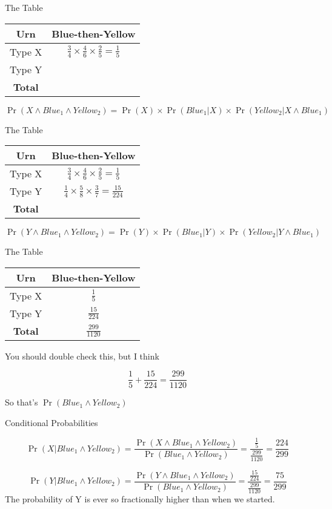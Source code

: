 \documentclass[
  ignorenonframetext,
]{beamer}
\renewcommand{\,}{\text{, }}
\begin{document}
\begin{frame}{The Table}
\protect\hypertarget{the-table}{}

\begin{longtable}[]{@{}cc@{}}
\toprule
Urn & Blue-then-Yellow\tabularnewline
\midrule
\endhead
Type X &
\(\frac{3}{4} \times \frac{4}{6} \times \frac{2}{5} = \frac{1}{5}\)\tabularnewline
Type Y &\tabularnewline
\textbf{Total} &\tabularnewline
\bottomrule
\end{longtable}

\[
\Pr(X \wedge Blue_1 \wedge Yellow_2) = \Pr(X) \times \Pr(Blue_1 | X) \times \Pr(Yellow_2 | X \wedge Blue_1)
\]

\end{frame}

\begin{frame}{The Table}
\protect\hypertarget{the-table-1}{}

\begin{longtable}[]{@{}cc@{}}
\toprule
Urn & Blue-then-Yellow\tabularnewline
\midrule
\endhead
Type X &
\(\frac{3}{4} \times \frac{4}{6} \times \frac{2}{5} = \frac{1}{5}\)\tabularnewline
Type Y &
\(\frac{1}{4} \times \frac{5}{8} \times \frac{3}{7} = \frac{15}{224}\)\tabularnewline
\textbf{Total} &\tabularnewline
\bottomrule
\end{longtable}

\[
\Pr(Y \wedge Blue_1 \wedge Yellow_2) = \Pr(Y) \times \Pr(Blue_1 | Y) \times \Pr(Yellow_2 | Y \wedge Blue_1)
\]

\end{frame}

\begin{frame}{The Table}
\protect\hypertarget{the-table-2}{}

\begin{longtable}[]{@{}cc@{}}
\toprule
Urn & Blue-then-Yellow\tabularnewline
\midrule
\endhead
Type X & \(\frac{1}{5}\)\tabularnewline
Type Y & \(\frac{15}{224}\)\tabularnewline
\textbf{Total} & \(\frac{299}{1120}\)\tabularnewline
\bottomrule
\end{longtable}

You should double check this, but I think

\[
\frac{1}{5} + \frac{15}{224} = \frac{299}{1120}
\]

So that's \(\Pr(Blue_1 \wedge Yellow_2)\)

\end{frame}

\begin{frame}{Conditional Probabilities}
\protect\hypertarget{conditional-probabilities}{}

\[
\Pr(X | Blue_1 \wedge Yellow_2) = \frac{\Pr(X \wedge Blue_1 \wedge Yellow_2)}{\Pr(Blue_1 \wedge Yellow_2)} = \frac{\frac{1}{5}}{\frac{299}{1120}} = \frac{224}{299}
\]

\[
\Pr(Y | Blue_1 \wedge Yellow_2) = \frac{\Pr(Y \wedge Blue_1 \wedge Yellow_2)}{\Pr(Blue_1 \wedge Yellow_2)} = \frac{\frac{15}{224}}{\frac{299}{1120}} = \frac{75}{299}
\] The probability of Y is ever so fractionally higher than when we
started.

\end{frame}
\end{document}
